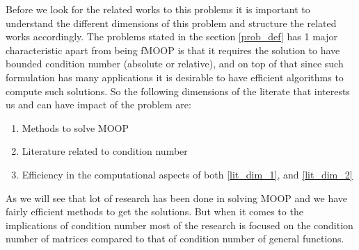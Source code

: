 \hspace{1cm}Before we look for the related works to this problems it is important to understand the different dimensions of this problem and structure the related works accordingly. The problems stated in the section \ref{prob_def} has 1 major characteristic apart from being fMOOP is that it requires the solution to have bounded condition number (absolute or relative), and on top of that since such formulation has many applications it is desirable to have efficient algorithms to compute such solutions. So the following dimensions of the literate that interests us and can have impact of the problem are:
\begin{enumerate}
    \item Methods to solve MOOP \label{lit_dim_1}
    \item Literature related to condition number \label{lit_dim_2}
    \item Efficiency in the computational aspects of both \ref{lit_dim_1}, and \ref{lit_dim_2}
\end{enumerate}
As we will see that lot of research has been done in solving MOOP and we have fairly efficient methods to get the solutions. But when it comes to the implications of condition number most of the research is focused on the condition number of matrices compared to that of condition number of general functions.

